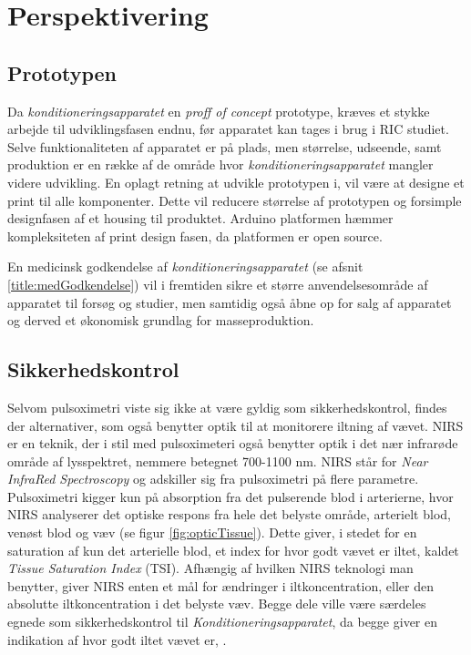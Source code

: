 \chapter{Perspektivering} 

\section{Prototypen}
Da \textit{konditioneringsapparatet} en \textit{proff of concept} prototype, kræves et stykke arbejde til udviklingsfasen endnu, før apparatet kan tages i brug i RIC studiet. Selve funktionaliteten af apparatet er på plads, men størrelse, udseende, samt produktion er en række af de område hvor \textit{konditioneringsapparatet} mangler videre udvikling. En oplagt retning at udvikle prototypen i, vil være at designe et print til alle komponenter. Dette vil reducere størrelse af prototypen og forsimple designfasen af et housing til produktet. Arduino platformen hæmmer kompleksiteten af print design fasen, da platformen er open source. 

En medicinsk godkendelse af \textit{konditioneringsapparatet} (se afsnit \ref{title:medGodkendelse}) vil i fremtiden sikre et større anvendelsesområde af apparatet til forsøg og studier, men samtidig også åbne op for salg af apparatet og derved et økonomisk grundlag for masseproduktion.


\section{Sikkerhedskontrol}\label{title:nirs}
Selvom pulsoximetri viste sig ikke at være gyldig som sikkerhedskontrol, findes der alternativer, som også benytter optik til at monitorere iltning af vævet. NIRS er en teknik, der i stil med pulsoximeteri også benytter optik i det nær infrarøde område af lysspektret, nemmere betegnet 700-1100 nm. NIRS står for \textit{Near InfraRed Spectroscopy} og adskiller sig fra pulsoximetri på flere parametre. Pulsoximetri kigger kun på absorption fra det pulserende blod i arterierne, hvor NIRS analyserer det optiske respons fra hele det belyste område, arterielt blod, venøst blod og væv (se figur \ref{fig:opticTissue}). Dette giver, i stedet for en saturation af kun det arterielle blod, et index for hvor godt vævet er iltet, kaldet \textit{Tissue Saturation Index} (TSI). Afhængig af hvilken NIRS teknologi man benytter, giver NIRS enten et mål for ændringer i iltkoncentration, eller den absolutte iltkoncentration i det belyste væv. Begge dele ville være særdeles egnede som sikkerhedskontrol til \textit{Konditioneringsapparatet}, da begge giver en indikation af hvor godt iltet vævet er, \cite{RefWorks:22} .

